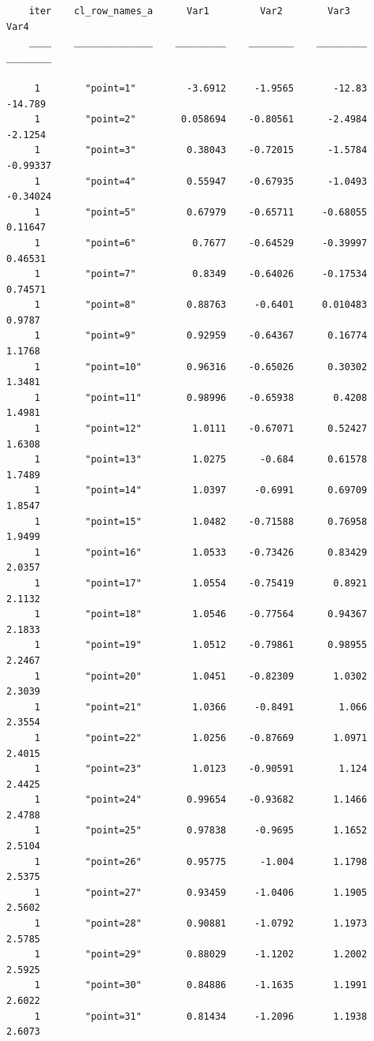 \documentclass[
]{book}
\begin{document}
\begin{verbatim}
    iter    cl_row_names_a      Var1         Var2        Var3         Var4  
    ____    ______________    _________    ________    _________    ________

     1        "point=1"         -3.6912     -1.9565       -12.83     -14.789
     1        "point=2"        0.058694    -0.80561      -2.4984     -2.1254
     1        "point=3"         0.38043    -0.72015      -1.5784    -0.99337
     1        "point=4"         0.55947    -0.67935      -1.0493    -0.34024
     1        "point=5"         0.67979    -0.65711     -0.68055     0.11647
     1        "point=6"          0.7677    -0.64529     -0.39997     0.46531
     1        "point=7"          0.8349    -0.64026     -0.17534     0.74571
     1        "point=8"         0.88763     -0.6401     0.010483      0.9787
     1        "point=9"         0.92959    -0.64367      0.16774      1.1768
     1        "point=10"        0.96316    -0.65026      0.30302      1.3481
     1        "point=11"        0.98996    -0.65938       0.4208      1.4981
     1        "point=12"         1.0111    -0.67071      0.52427      1.6308
     1        "point=13"         1.0275      -0.684      0.61578      1.7489
     1        "point=14"         1.0397     -0.6991      0.69709      1.8547
     1        "point=15"         1.0482    -0.71588      0.76958      1.9499
     1        "point=16"         1.0533    -0.73426      0.83429      2.0357
     1        "point=17"         1.0554    -0.75419       0.8921      2.1132
     1        "point=18"         1.0546    -0.77564      0.94367      2.1833
     1        "point=19"         1.0512    -0.79861      0.98955      2.2467
     1        "point=20"         1.0451    -0.82309       1.0302      2.3039
     1        "point=21"         1.0366     -0.8491        1.066      2.3554
     1        "point=22"         1.0256    -0.87669       1.0971      2.4015
     1        "point=23"         1.0123    -0.90591        1.124      2.4425
     1        "point=24"        0.99654    -0.93682       1.1466      2.4788
     1        "point=25"        0.97838     -0.9695       1.1652      2.5104
     1        "point=26"        0.95775      -1.004       1.1798      2.5375
     1        "point=27"        0.93459     -1.0406       1.1905      2.5602
     1        "point=28"        0.90881     -1.0792       1.1973      2.5785
     1        "point=29"        0.88029     -1.1202       1.2002      2.5925
     1        "point=30"        0.84886     -1.1635       1.1991      2.6022
     1        "point=31"        0.81434     -1.2096       1.1938      2.6073

\end{verbatim}
\end{document}
